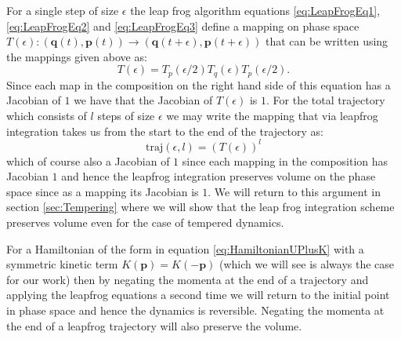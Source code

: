 \documentclass[12pt]{article}
\begin{document}
            For a single step of size $\epsilon$ the leap frog algorithm equations \ref{eq:LeapFrogEq1}, \ref{eq:LeapFrogEq2} and \ref{eq:LeapFrogEq3} define a mapping on phase space $T\left(\epsilon\right): \left(\bm{q}\left(t\right),\bm{p}\left(t\right)\right) \rightarrow \left(\bm{q}\left(t+\epsilon\right),\bm{p}\left(t+\epsilon\right)\right)$ that can be written using the mappings given above as:
            \begin{equation}
                T\left(\epsilon\right)=T_p\left(\epsilon/2\right)T_q\left(\epsilon\right)T_p\left(\epsilon/2\right).
            \end{equation}
            Since each map in the composition on the right hand side of this equation has a Jacobian of $1$ we have that the Jacobian of $T\left(\epsilon\right)$ is $1$. For the total trajectory which consists of $l$ steps of size $\epsilon$ we may write the mapping that via leapfrog integration takes us from the start to the end of the trajectory as:
            \begin{equation}
                \text{traj}\left(\epsilon,l\right) = \left(T\left(\epsilon\right)\right)^l
            \end{equation}
            which of course also a Jacobian of $1$ since each mapping in the composition has Jacobian $1$ and hence the leapfrog integration preserves volume on the phase space since as a mapping its Jacobian is $1$. We will return to this argument in section \ref{sec:Tempering} where we will show that the leap frog integration scheme preserves volume even for the case of tempered dynamics. 
            
            For a Hamiltonian of the form in equation \ref{eq:HamiltonianUPlusK} with a symmetric kinetic term $K\left(\bm{p}\right)=K\left(-\bm{p}\right)$ (which we will see is always the case for our work) then by negating the momenta at the end of a trajectory and applying the leapfrog equations a second time we will return to the initial point in phase space and hence the dynamics is reversible. Negating the momenta at the end of a leapfrog trajectory will also preserve the volume.



        
\end{document}
